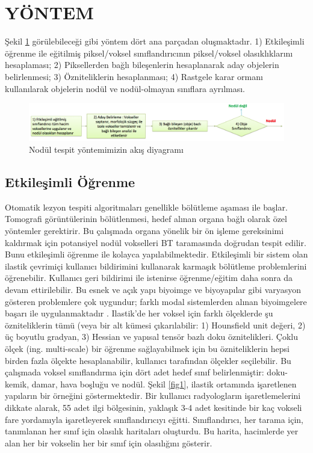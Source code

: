 \documentclass[conference]{IEEEtran}
\begin{document}
\section{YÖNTEM}
Şekil \ref{figflow} görülebileceği gibi yöntem dört ana parçadan oluşmaktadır. 1) Etkileşimli öğrenme ile eğitilmiş piksel/voksel sınıflandırıcının piksel/voksel olasıklıklarını hesaplaması; 2) Piksellerden bağlı bileşenlerin hesaplanarak aday objelerin belirlenmesi; 3) Özniteliklerin hesaplanması; 4) Rastgele karar ormanı kullanılarak objelerin nodül ve nodül-olmayan sınıflara ayrılması.

\begin{figure}[tb!]
\centering
\includegraphics[width=\textwidth]{figs/flow.png}
\caption{Nodül tespit yöntemimizin akış diyagramı}
\label{figflow}
\end{figure}

\subsection{Etkileşimli Öğrenme}\label{ilastik}
Otomatik lezyon tespiti algoritmaları genellikle bölütleme aşaması ile başlar. Tomografi görüntülerinin bölütlenmesi, hedef alınan organa bağlı olarak özel yöntemler gerektirir. Bu çalışmada organa yönelik bir ön işleme gereksinimi kaldırmak için potansiyel nodül vokselleri BT taramasında doğrudan tespit edilir. Bunu etkileşimli öğrenme ile kolayca yapılabilmektedir. Etkileşimli bir sistem olan ilastik \cite{sommer2011} çevrimiçi kullanıcı bildirimini kullanarak karmaşık bölütleme problemlerini öğrenebilir. Kullanıcı geri bildirimi ile istenirse öğrenme/eğitim daha sonra da devam ettirilebilir. Bu esnek ve açık yapı biyoimge ve biyoyapılar gibi varyasyon gösteren problemlere çok uygundur; farklı modal sistemlerden alınan biyoimgelere başarı ile uygulanmaktadır \cite{tek2014}. 
Ilastik'de her voksel için farklı ölçeklerde şu özniteliklerin tümü (veya bir alt kümesi çıkarılabilir: 1) Hounsfield unit değeri, 2) üç boyutlu gradyan, 3) Hessian ve yapısal tensör bazlı doku öznitelikleri. Çoklu ölçek (ing. multi-scale) bir öğrenme sağlayabilmek için bu özniteliklerin hepsi birden fazla ölçekte hesaplanabilir, kullanıcı tarafından ölçekler seçilebilir. Bu çalışmada voksel sınıflandırma için dört adet hedef sınıf belirlenmiştir: doku-kemik, damar, hava boşluğu ve nodül. Şekil \ref{fig1}, ilastik ortamında işaretlenen yapıların bir örneğini göstermektedir. Bir kullanıcı radyologların işaretlemelerini dikkate alarak, 55 adet ilgi bölgesinin, yaklaşık 3-4 adet kesitinde bir kaç vokseli fare yordamıyla işaretleyerek sınıflandırıcıyı eğitti. Sınıflandırıcı, her tarama için, tanımlanan her sınıf için olasılık haritaları oluşturdu. Bu harita, hacimlerde yer alan her bir vokselin her bir sınıf için olasılığını gösterir.
\end{document}
